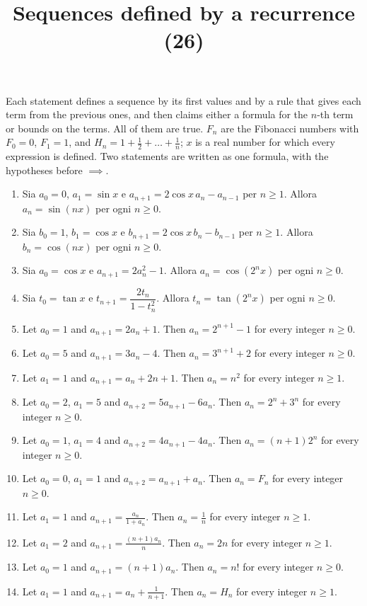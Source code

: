 \documentclass[11pt,a4paper]{article}
\title{Sequences defined by a recurrence (26)}
\author{}
\date{}
\begin{document}
\maketitle
Each statement defines a sequence by its first values and by a rule that gives each term from the previous ones, and then claims either a formula for the $n$-th term or bounds on the terms. All of them are true. $F_n$ are the Fibonacci numbers with $F_0 = 0$, $F_1 = 1$, and $H_n = 1 + \frac12 + \dots + \frac1n$; $x$ is a real number for which every expression is defined. Two statements are written as one formula, with the hypotheses before $\implies$.

\begin{enumerate}
\item Sia $a_0=0$, $a_1=\sin x$ e $a_{n+1}=2\cos x\,a_n-a_{n-1}$ per $n\ge1$. Allora $a_n=\sin(nx)$ per ogni $n\ge0$.
\item Sia $b_0=1$, $b_1=\cos x$ e $b_{n+1}=2\cos x\,b_n-b_{n-1}$ per $n\ge1$. Allora $b_n=\cos(nx)$ per ogni $n\ge0$.
\item Sia $a_0=\cos x$ e $a_{n+1}=2a_n^2-1$. Allora $a_n=\cos\left(2^n x\right)$ per ogni $n\ge0$.
\item Sia $t_0=\tan x$ e $t_{n+1}=\dfrac{2t_n}{1-t_n^2}$. Allora $t_n=\tan\left(2^n x\right)$ per ogni $n\ge0$.
\item Let $a_0=1$ and $a_{n+1}=2a_n+1$. Then $a_n=2^{n+1}-1$ for every integer $n\ge0$.
\item Let $a_0=5$ and $a_{n+1}=3a_n-4$. Then $a_n=3^{n+1}+2$ for every integer $n\ge0$.
\item Let $a_1=1$ and $a_{n+1}=a_n+2n+1$. Then $a_n=n^2$ for every integer $n\ge1$.
\item Let $a_0=2$, $a_1=5$ and $a_{n+2}=5a_{n+1}-6a_n$. Then $a_n=2^n+3^n$ for every integer $n\ge0$.
\item Let $a_0=1$, $a_1=4$ and $a_{n+2}=4a_{n+1}-4a_n$. Then $a_n=\left(n+1\right)2^n$ for every integer $n\ge0$.
\item Let $a_0=0$, $a_1=1$ and $a_{n+2}=a_{n+1}+a_n$. Then $a_n=F_n$ for every integer $n\ge0$.
\item Let $a_1=1$ and $a_{n+1}=\frac{a_n}{1+a_n}$. Then $a_n=\frac{1}{n}$ for every integer $n\ge1$.
\item Let $a_1=2$ and $a_{n+1}=\frac{\left(n+1\right)a_n}{n}$. Then $a_n=2n$ for every integer $n\ge1$.
\item Let $a_0=1$ and $a_{n+1}=\left(n+1\right)a_n$. Then $a_n=n!$ for every integer $n\ge0$.
\item Let $a_1=1$ and $a_{n+1}=a_n+\frac{1}{n+1}$. Then $a_n=H_n$ for every integer $n\ge1$.

\end{enumerate}
\end{document}
